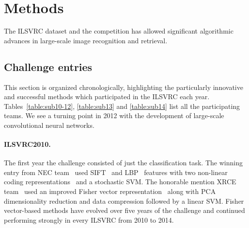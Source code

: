 

\section{Methods}
\label{sec:Methods}

The ILSVRC dataset and the competition has allowed significant algorithmic advances in large-scale image recognition and retrieval. 



\subsection{Challenge entries}
\label{sec:MethodsEntries}


This section is organized chronologically, highlighting the particularly innovative and successful methods which participated in the ILSVRC each year. Tables~\ref{table:sub10-12}, \ref{table:sub13} and \ref{table:sub14} list all the participating teams. We see a turning point in 2012
with the development of large-scale convolutional neural networks.

\paragraph{ILSVRC2010.} The first year the challenge consisted of just the classification task. The winning entry from NEC team~\citep{Lin11} used SIFT~\citep{Lowe04} and LBP~\citep{LBP} features with two non-linear coding representations~\citep{Zhou10,LLC} and a stochastic SVM. The honorable mention XRCE team~\citep{Perronnin10} used an improved Fisher vector representation~\citep{Perronnin07} along with PCA dimensionality reduction and data compression followed by a linear SVM. Fisher vector-based methods have evolved over five years of the challenge and continued performing strongly in every ILSVRC from 2010 to 2014.

